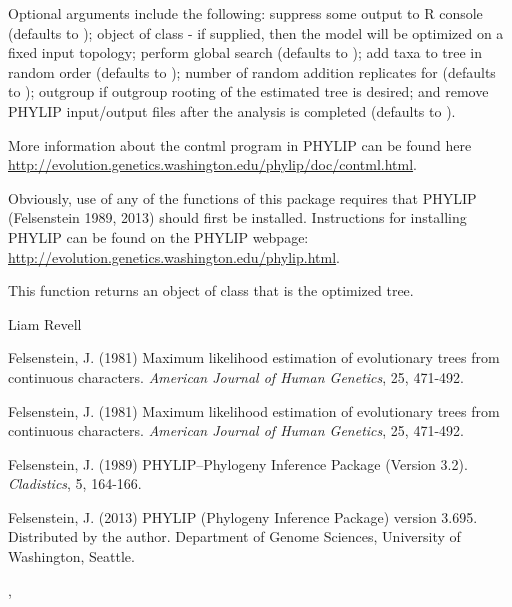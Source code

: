 \documentclass[a4paper]{book}
\begin{document}
%
\begin{Details}\relax
Optional arguments include the following:  suppress some output to R console (defaults to );  object of class  - if supplied, then the model will be optimized on a fixed input topology;  perform global search (defaults to );  add taxa to tree in random order (defaults to );  number of random addition replicates for  (defaults to );  outgroup if outgroup rooting of the estimated tree is desired; and  remove PHYLIP input/output files after the analysis is completed (defaults to ).

More information about the contml program in PHYLIP can be found here \url{http://evolution.genetics.washington.edu/phylip/doc/contml.html}.

Obviously, use of any of the functions of this package requires that PHYLIP (Felsenstein 1989, 2013) should first be installed. Instructions for installing PHYLIP can be found on the PHYLIP webpage: \url{http://evolution.genetics.washington.edu/phylip.html}.
\end{Details}
%
\begin{Value}
This function returns an object of class  that is the optimized tree.
\end{Value}
%
\begin{Author}\relax
Liam Revell 
\end{Author}
%
\begin{References}\relax
Felsenstein, J. (1981) Maximum likelihood estimation of evolutionary trees from continuous characters. \emph{American Journal of Human Genetics}, 25, 471-492.

Felsenstein, J. (1981) Maximum likelihood estimation of evolutionary trees from continuous characters. \emph{American Journal of Human Genetics}, 25, 471-492.

Felsenstein, J. (1989) PHYLIP--Phylogeny Inference Package (Version 3.2). \emph{Cladistics}, 5, 164-166.

Felsenstein, J. (2013) PHYLIP (Phylogeny Inference Package) version 3.695. Distributed by the author. Department of Genome Sciences, University of Washington, Seattle.
\end{References}
%
\begin{SeeAlso}\relax
{}, 
\end{SeeAlso}
\end{document}
